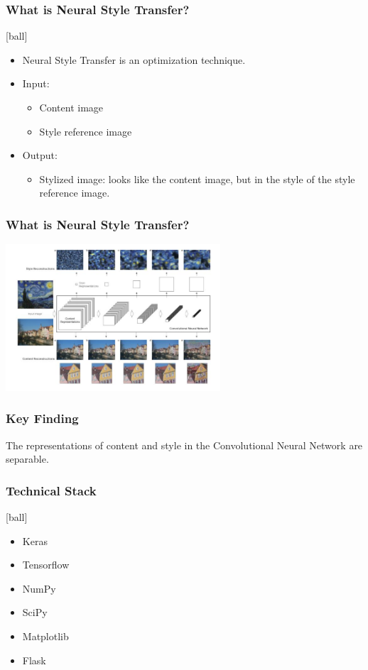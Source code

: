 \documentclass[14pt]{beamer}
\begin{document}
\begin{frame}
		\frametitle{What is Neural Style Transfer?}
		\begin{itemize}
            \item Neural Style Transfer is an optimization technique.
           \item Input:
		\begin{itemize}
		     \item Content image
		     \item Style reference image
		\end{itemize}
             \item Output:
		\begin{itemize}
             \item Stylized image: looks like the content image, but  in the style of the style
        reference image.
        \end{itemize}
        \end{itemize}
\end{frame}

\begin{frame}
    \frametitle{What is Neural Style Transfer?}
    \begin{center}
        \includegraphics[width=80mm]{exp.jpg}
    \end{center}
\end{frame}

\begin{frame}
		\frametitle{Key Finding}
		The representations of content and style in the Convolutional Neural Network are separable.
\end{frame}

\begin{frame}
		\frametitle{Technical Stack}
		\begin{itemize}
		\item Keras 
        \item Tensorflow
		\item NumPy
		\item SciPy
        \item Matplotlib
		\item Flask  
		\end{itemize}
\end{frame}
\end{document}
